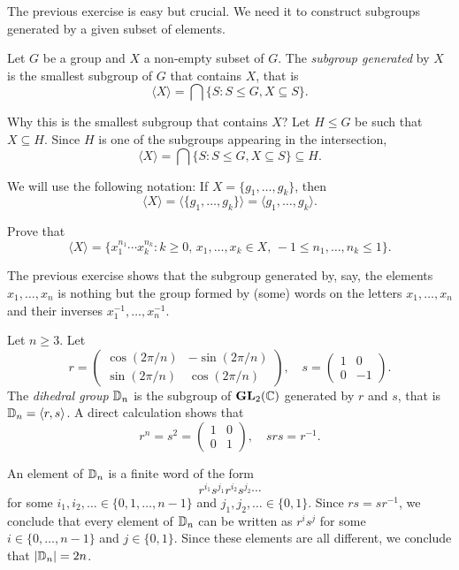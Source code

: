 The previous exercise is easy but crucial. We need it 
to construct subgroups generated 
by a given subset of elements. 

\begin{definition}
        Let $G$ be a group and $X$ a non-empty 
        subset of $G$. The \emph{subgroup
        generated} by $X$ is the smallest subgroup of $G$ that contains
        $X$, that is 
        \[
            \langle X\rangle=\bigcap\{S:S\leq G,X\subseteq S\}.
        \]
\end{definition}

Why this is the smallest subgroup that contains $X$? 
Let $H\leq G$ be such that 
$X\subseteq H$. Since $H$ is one of the subgroups appearing
in the intersection, 
\[
        \langle X\rangle=\bigcap\{S:S\leq G,X\subseteq S\}\subseteq H.        
\]

We will use the following notation:
If $X=\{g_1,\dots,g_k\}$, then 
\[
\langle
X\rangle=\langle\{g_1,\dots,g_k\}\rangle=\langle g_1,\dots,g_k\rangle.
\]

\begin{exercise}
\label{xca:generated}
Prove that 
\[
    \langle X\rangle=\{x_1^{n_1}\cdots x_k^{n_k}:k\geq0,\,x_1,\dots,x_k\in X,\,-1\leq n_1,\dots,n_k\leq 1\}.
\]
\end{exercise}

The previous exercise shows that
the subgroup generated by, say, the elements 
$x_1,\dots,x_n$ is nothing but the 
group formed by (some) words on the letters 
$x_1,\dots,x_n$ and their inverses 
$x_1^{-1},\dots,x_n^{-1}$. 

\begin{example}
Let $n\geq3$. Let 
\[
r=\begin{pmatrix}
\cos(2\pi/n) & -\sin(2\pi/n)\\
\sin(2\pi/n) & \cos(2\pi/n)
\end{pmatrix},
\quad
s=\begin{pmatrix}
        1 & 0\\
        0 & -1
\end{pmatrix}.
\]
The \emph{dihedral group} $\mathbb{D}_n$ is the subgroup of
$\mathbf{GL}_2(\mathbb{C})$ generated by $r$ and $s$,
that is $\mathbb{D}_n=\langle r,s\rangle$. A direct calculation shows that 
\[
r^n=s^2=\begin{pmatrix}
        1&0\\
        0&1
\end{pmatrix},
\quad
srs=r^{-1}.
\]

An element of $\mathbb{D}_n$ is a finite word of the form 
\[
r^{i_1}s^{j_1}r^{i_2}s^{j_2}\cdots
\]
for some 
 $i_1,i_2,\dots\in\{0,1,\dots,n-1\}$ and 
$j_1,j_2,\dots\in\{0,1\}$. Since $rs=sr^{-1}$, we conclude that
every element of $\mathbb{D}_n$ can be written as $r^is^j$ 
for some $i\in\{0,\dots,n-1\}$ and $j\in\{0,1\}$. Since these elements are all different, we conclude that 
$|\mathbb{D}_n|=2n$.
\end{example}

